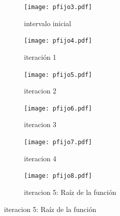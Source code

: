 \begin{figure}[H]
	\centering
	\begin{subfigure}{0.4\textwidth}
		{\texttt{[image: pfijo3.pdf]}}
		\caption{intervalo inicial}
		\label{fig:pfijo21}
	\end{subfigure}
	\begin{subfigure}{0.4\textwidth}
		{\texttt{[image: pfijo4.pdf]}}
		\caption{iteración 1}
	\end{subfigure}	
	\begin{subfigure}{0.4\textwidth}
		{\texttt{[image: pfijo5.pdf]}}
		\caption{iteracion 2}
	\end{subfigure}
	\begin{subfigure}{0.4\textwidth}
		{\texttt{[image: pfijo6.pdf]}}
		\caption{iteracion 3}
	\end{subfigure}
	\begin{subfigure}{0.4\textwidth}
		{\texttt{[image: pfijo7.pdf]}}
		\caption{iteracion 4}
	\end{subfigure}
	\begin{subfigure}{0.4\textwidth}
		{\texttt{[image: pfijo8.pdf]}}
		\caption{iteracion 5: Raíz de la función}
		\label{fig:pfijo25}
	\end{subfigure}
	\label{fig:pfijo2}
\end{figure}
%
